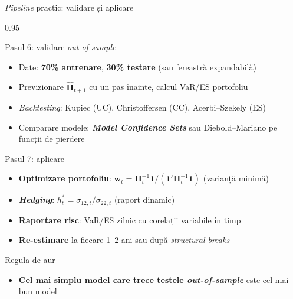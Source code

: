 \documentclass[9pt, aspectratio=169, t]{beamer}
\begin{document}
\begin{frame}{\textit{Pipeline} practic: validare și aplicare}
    \begin{cminipage}{0.95\textwidth}
    \vspace{-2mm}
    {\scriptsize
    \begin{block}{Pasul 6: validare \textit{out-of-sample}}
        \begin{itemize}\setlength{\itemsep}{0pt}
            \item Date: \textbf{70\% antrenare}, \textbf{30\% testare} (sau fereastră expandabilă)
            \item Previzionare $\hat{\mathbf{H}}_{t+1}$ cu un pas înainte, calcul VaR/ES portofoliu
            \item \textit{Backtesting}: Kupiec (UC), Christoffersen (CC), Acerbi--Szekely (ES)
            \item Comparare modele: \textbf{\textit{Model Confidence Sets}} sau Diebold--Mariano pe funcții de pierdere
        \end{itemize}
    \end{block}
    \vspace{-1mm}
    \begin{block}{Pasul 7: aplicare}
        \begin{itemize}\setlength{\itemsep}{0pt}
            \item \textbf{Optimizare portofoliu}: $\mathbf{w}_t = \mathbf{H}_t^{-1}\mathbf{1} / (\mathbf{1}'\mathbf{H}_t^{-1}\mathbf{1})$ (varianță minimă)
            \item \textbf{\textit{Hedging}}: $h_t^* = \sigma_{12,t}/\sigma_{22,t}$ (raport dinamic)
            \item \textbf{Raportare risc}: VaR/ES zilnic cu corelații variabile în timp
            \item \textbf{Re-estimare} la fiecare 1--2 ani sau după \textit{structural breaks}
        \end{itemize}
    \end{block}
    \vspace{-1mm}
    \begin{alertblock}{Regula de aur}
        \begin{itemize}\setlength{\itemsep}{0pt}
            \item \textbf{Cel mai simplu model care trece testele \textit{out-of-sample}} este cel mai bun model
        \end{itemize}
    \end{alertblock}
    }
    \end{cminipage}
\end{frame}
\end{document}
